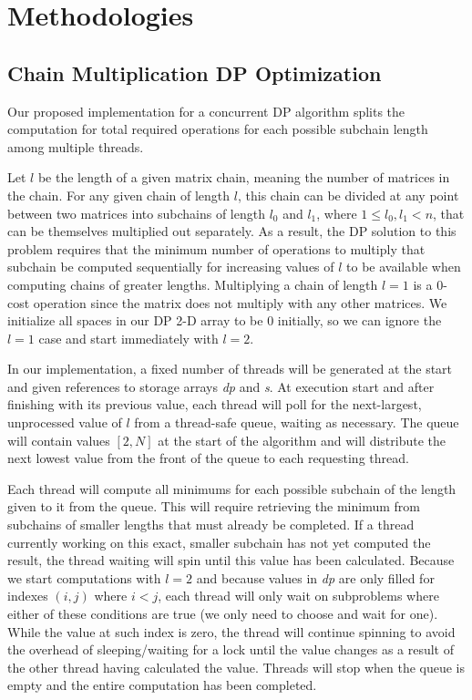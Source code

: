 \documentclass[conference,leqno]{IEEEtran}
\begin{document}
\section{Methodologies}
\subsection{Chain Multiplication DP Optimization}
Our proposed implementation for a concurrent DP algorithm splits the computation for total required operations for each possible subchain length among multiple threads.

Let $l$ be the length of a given matrix chain, meaning the number of matrices in the chain. For any given chain of length $l$, this chain can be divided at any point between two matrices into subchains of length $l_0$ and $l_1$, where $1 \leq l_0, l_1 < n$, that can be themselves multiplied out separately. As a result, the DP solution to this problem requires that the minimum number of operations to multiply that subchain be computed sequentially for increasing values of $l$ to be available when computing chains of greater lengths. Multiplying a chain of length $l=1$ is a $0$-cost operation since the matrix does not multiply with any other matrices. We initialize all spaces in our DP 2-D array to be $0$ initially, so we can ignore the $l = 1$ case and start immediately with $l = 2$.

In our implementation, a fixed number of threads will be generated at the start and given references to storage arrays \emph{dp} and \emph{s}. At execution start and after finishing with its previous value, each thread will poll for the next-largest, unprocessed value of $l$ from a thread-safe queue, waiting as necessary. The queue will contain values $[2, N]$ at the start of the algorithm and will distribute the next lowest value from the front of the queue to each requesting thread.

Each thread will compute all minimums for each possible subchain of the length given to it from the queue. This will require retrieving the minimum from subchains of smaller lengths that must already be completed. If a thread currently working on this exact, smaller subchain has not yet computed the result, the thread waiting will spin until this value has been calculated. Because we start computations with $l = 2$ and because values in \emph{dp} are only filled for indexes $(i, j)$ where $i < j$, each thread will only wait on subproblems where either of these conditions are true (we only need to choose and wait for one). While the value at such index is zero, the thread will continue spinning to avoid the overhead of sleeping/waiting for a lock until the value changes as a result of the other thread having calculated the value. Threads will stop when the queue is empty and the entire computation has been completed.
\end{document}
